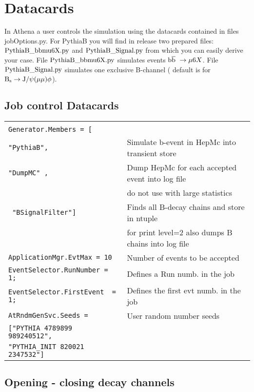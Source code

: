 \section{Datacards}


In Athena a user controls the simulation using the datacards
contained in files jobOptions.py. For PythiaB  you will find in
release two prepared files: {\bf $\rm PythiaB\_bbmu6X.py$} and
{\bf $\rm PythiaB\_Signal.py$} from which you can easily derive
your case. File {\bf $\rm PythiaB\_bbmu6X.py$} simulates events
$\mbox{$\rm b\overline{b}\ $} \rightarrow \mu6 X$. File {\bf $\rm PythiaB\_Signal.py$}
simulates one exclusive B-channel ( default is for $ \rm B_{s}
\rightarrow J/\psi(\mu\mu) \phi $).


\subsection{ Job control Datacards  }
\begin{tabular}{|p{75mm}|p{90mm}|}
\hline  & \\

\verb!Generator.Members = [!& \\ \hline
 \verb!"PythiaB",! & Simulate b-event in HepMc into  transient
 store\\ \hline
 \verb!"DumpMC" ,!  & Dump HepMc for each accepted event into  log file\\
             & do not use with large statistics \\ \hline
 \verb! "BSignalFilter"]!    & Finds all B-decay chains and store in ntuple\\
    &  for print  level=2 also dumps B chains into log file \\
 \hline
\verb!ApplicationMgr.EvtMax = 10! & Number of events to be accepted \\
\hline
\verb!EventSelector.RunNumber = 1;!& Defines a Run numb. in the job \\
\hline
\verb!EventSelector.FirstEvent  = 1;!& Defines the first evt numb. in the job\\
\hline
\verb!AtRndmGenSvc.Seeds =! & User random number seeds\\
\verb!["PYTHIA 4789899 989240512", ! &\\
\verb!"PYTHIA_INIT 820021 2347532"]! &\\ \hline


 
\end{tabular}



\subsection{  Opening - closing decay channels }



